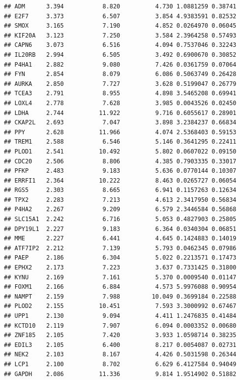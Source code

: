 \documentclass{article}\usepackage[]{graphicx}\usepackage[]{color}
\makeatletter
\newenvironment{kframe}{%
 \def\at@end@of@kframe{}%
 \ifinner\ifhmode%
  \def\at@end@of@kframe{\end{minipage}}%
  \begin{minipage}{\columnwidth}%
 \fi\fi%
 \def\FrameCommand##1{\hskip\@totalleftmargin \hskip-\fboxsep
 \colorbox{shadecolor}{##1}\hskip-\fboxsep
     \hskip-\linewidth \hskip-\@totalleftmargin \hskip\columnwidth}%
 \MakeFramed {\advance\hsize-\width
   \@totalleftmargin\z@ \linewidth\hsize
   \@setminipage}}%
 {\par\unskip\endMakeFramed%
 \at@end@of@kframe}
\newenvironment{knitrout}{}{} %
\makeatother
\begin{document}
\begin{knitrout}
\begin{kframe}
\begin{verbatim}
## ADM      3.394           8.820          4.730 1.0881259 0.38741
## E2F7     3.373           6.507          3.854 4.9383591 0.82532
## SMOX     3.165           7.190          4.852 0.0264970 0.06045
## KIF20A   3.123           7.250          3.584 2.3964258 0.57493
## CAPN6    3.073           6.516          4.094 0.7537046 0.32243
## IL20RB   2.994           6.505          3.492 0.6900670 0.30852
## P4HA1    2.882           9.080          7.426 0.0361759 0.07064
## FYN      2.854           8.079          6.086 0.5063749 0.26428
## AURKA    2.850           7.727          3.628 0.5199047 0.26779
## TCEA3    2.791           8.955          4.898 3.5465208 0.69941
## LOXL4    2.778           7.628          3.985 0.0043526 0.02450
## LDHA     2.744          11.922          9.716 0.6055617 0.28901
## CKAP2L   2.693           7.047          3.898 3.2384237 0.66834
## PPY      2.628          11.966          4.074 2.5368403 0.59153
## TREM1    2.588           6.546          5.146 0.3641295 0.22411
## PLOD1    2.541          10.492          5.802 0.0607022 0.09150
## CDC20    2.506           8.806          4.385 0.7903335 0.33017
## PFKP     2.483           9.183          5.636 0.0770144 0.10307
## ERRFI1   2.364          10.222          8.463 0.0265727 0.06054
## RGS5     2.303           8.665          6.941 0.1157263 0.12634
## TPX2     2.283           7.213          4.613 2.3417950 0.56834
## P4HA2    2.267           9.209          6.579 2.3446584 0.56868
## SLC15A1  2.242           6.716          5.053 0.4827903 0.25805
## DPY19L1  2.227           9.183          6.364 0.0340304 0.06851
## MME      2.227           6.441          4.645 0.1424883 0.14019
## ATF7IP2  2.212           7.139          5.793 0.0462345 0.07986
## PAEP     2.186           6.304          5.022 0.2213571 0.17473
## EPHX2    2.173           7.223          3.637 0.7331425 0.31800
## KYNU     2.169           7.161          5.370 0.0009540 0.01147
## FOXM1    2.166           6.884          4.573 5.9976088 0.90954
## NAMPT    2.159           7.988         10.049 0.3699184 0.22588
## PLOD2    2.155          10.451          7.593 3.3000992 0.67467
## UPP1     2.130           9.094          4.411 1.2476835 0.41484
## KCTD10   2.119           7.907          6.094 0.0003352 0.00680
## ZNF185   2.105           7.420          3.933 1.0598714 0.38235
## EDIL3    2.105           6.400          8.217 0.0054087 0.02731
## NEK2     2.103           8.167          4.426 0.5031598 0.26344
## LCP1     2.100           8.702          6.629 6.4127584 0.94049
## GAPDH    2.086          11.336          9.814 1.9514902 0.51882

\end{verbatim}
\end{kframe}
\end{knitrout}
\end{document}
